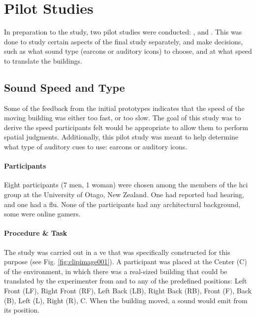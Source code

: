 \section{Pilot Studies}
In preparation to the  study, two pilot studies were conducted: , and . This was done to study certain aspects of the final study separately, and make decisions, such as what sound type (earcons or auditory icons) to choose, and at what speed to translate the buildings.
















\subsection{Sound Speed and Type}
\label{study_one}
Some of the feedback from the initial prototypes indicates that the speed of the moving building was either too fast, or too slow. The goal of this study was to derive the speed participants felt would be appropriate to allow them to perform spatial judgments. Additionally, this pilot study was meant to help determine what type of auditory cues to use: earcons or auditory icons.

\paragraph{Participants}
Eight participants (7 men, 1 woman) were chosen among the members of the \gls{hci} group at the University of Otago, New Zealand. One had reported bad hearing, and one had a flu.  None of the participants had any architectural background, some were online gamers.

\paragraph{Procedure \& Task}
The study was carried out in a \gls{ve} that was specifically constructed for this purpose (see Fig. \ref{fig:clipimage001}). A participant was placed at the Center (C) of the environment, in which there was a real-sized building that could be translated by the experimenter from and to any of the predefined positions: Left Front (LF), Right Front (RF), Left Back (LB), Right Back (RB), Front (F), Back (B), Left (L), Right (R), C. When the building moved, a sound would emit from its position.

